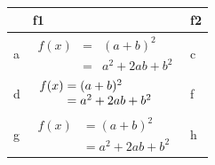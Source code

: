 \begin{table} 
	\centering 
	\renewcommand{\arraystretch}{1.3}
	\begin{tabular}{|l|l|l|}
		\hline %
		&f1& f2 \\[0.5ex] 
		\hline 
		a& $\begin{array} {lcl} f(x) & = & (a+b)^2 \\ & = & a^2+2ab+b^2 \end{array}$ & c\\ 
		\hline 
		d& $\begin{array} {r@{}l@{}} f(x) & {}= (a+b)^2 \\ & {}= a^2+2ab+b^2 \end{array}$ & f\\    \hline 
		g& $\begin{aligned} f(x) & = (a+b)^2 \\ & = a^2+2ab+b^2 \end{aligned}$ &h \\ \hline 
	\end{tabular}
	\label{label 1}
\end{table}
